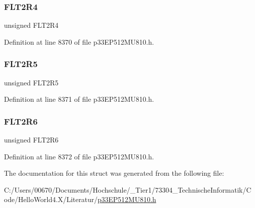 \subsubsection{\texorpdfstring{F\+L\+T2\+R4}{FLT2R4}}
{\footnotesize\ttfamily unsigned F\+L\+T2\+R4}



Definition at line 8370 of file p33\+E\+P512\+M\+U810.\+h.

\mbox{\label{structtag_r_p_i_n_r12_b_i_t_s_a38235fd1dc5652223dd91768e657b925}} 
\subsubsection{\texorpdfstring{F\+L\+T2\+R5}{FLT2R5}}
{\footnotesize\ttfamily unsigned F\+L\+T2\+R5}



Definition at line 8371 of file p33\+E\+P512\+M\+U810.\+h.

\mbox{\label{structtag_r_p_i_n_r12_b_i_t_s_a01cbb2c5ce422bacb10c9520ab906648}} 
\subsubsection{\texorpdfstring{F\+L\+T2\+R6}{FLT2R6}}
{\footnotesize\ttfamily unsigned F\+L\+T2\+R6}



Definition at line 8372 of file p33\+E\+P512\+M\+U810.\+h.



The documentation for this struct was generated from the following file\+:\begin{DoxyCompactItemize}
\item 
C\+:/\+Users/00670/\+Documents/\+Hochschule/\+\_\+\+Tier1/73304\+\_\+\+Technische\+Informatik/\+Code/\+Hello\+World4.\+X/\+Literatur/\hyperlink{p33_e_p512_m_u810_8h}{p33\+E\+P512\+M\+U810.\+h}\end{DoxyCompactItemize}
